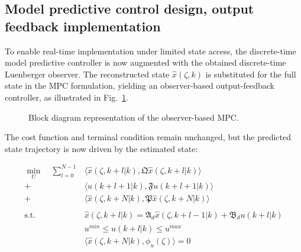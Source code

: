 \subsection{Model predictive control design, output feedback implementation}

To enable real-time implementation under limited state access, the discrete-time model predictive controller is now augmented with the obtained discrete-time Luenberger observer. The reconstructed state ${\hat{x}}(\zeta,k)$ is substituted for the full state in the MPC formulation, yielding an observer-based output-feedback controller, as illustrated in Fig.~\ref{fig:2_block_diagram_obs}.

\begin{figure}[!htbp]
    \centering
    \caption{Block diagram representation of the observer-based MPC.}
    \label{fig:2_block_diagram_obs}
\end{figure}

The cost function and terminal condition remain unchanged, but the predicted state trajectory is now driven by the estimated state:

\begin{equation} \label{eq:2_MPC_finite_time_hat}
    \begin{aligned}
        \min_{U} \quad \sum_{l=0}^{N-1} &\langle {\hat{x}}(\zeta, k+l | k), \mathfrak{Q} {\hat{x}}(\zeta, k+l | k) \rangle \\
        + &\langle u(k+l+1 | k), \mathfrak{F} u(k+l+1|k) \rangle \\
        + &\langle {\hat{x}}(\zeta, k+N | k), \mathfrak{P} {\hat{x}}(\zeta, k+N | k) \rangle \\
        \, \\
        \text{s.t.} \quad &{\hat{x}}(\zeta, k+l | k) = \mathfrak{A}_d {\hat{x}}(\zeta, k+l-1 | k) + \mathfrak{B}_d u(k+l | k) \\
        &u^{min} \leq u(k+l | k) \leq u^{max} \\
        & \langle {\hat{x}}(\zeta, k+N | k), {\phi_u}(\zeta) \rangle = 0
    \end{aligned}
\end{equation}

